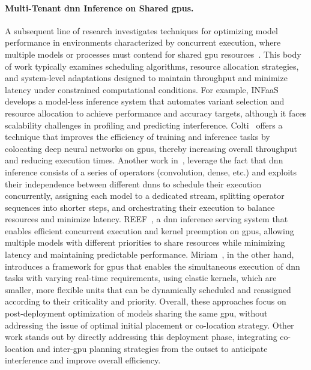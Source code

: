 \paragraph{Multi-Tenant \acrshort{dnn} Inference on Shared \acrshort{gpu}s.}
A subsequent line of research investigates techniques for optimizing model performance in environments characterized by concurrent execution, where multiple models or processes must contend for shared \acrshort{gpu} resources~\cite{mobin2023colti,yu2021automated,zhao2023miriam,francisco2021infaas}. This body of work typically examines scheduling algorithms, resource allocation strategies, and system-level adaptations designed to maintain throughput and minimize latency under constrained computational conditions. For example, INFaaS~\cite{francisco2021infaas} develops a model-less inference system that automates variant selection and resource allocation to achieve performance and accuracy targets, although it faces scalability challenges in profiling and predicting interference. Colti~\cite{mobin2023colti} offers a technique that improves the efficiency of training and inference tasks by colocating deep neural networks on \acrshort{gpu}s, thereby increasing overall throughput and reducing execution times. Another work in~\cite{yu2021automated}, leverage the fact that \acrshort{dnn} inference consists of a series of operators (convolution, dense, etc.) and exploits their independence between different \acrshort{dnn}s to schedule their execution concurrently, assigning each model to a dedicated stream, splitting operator sequences into shorter steps, and orchestrating their execution to balance resources and minimize latency. REEF~\cite{han2022microsecond}, a \acrshort{dnn} inference serving system that enables efficient concurrent execution and kernel preemption on \acrshort{gpu}s, allowing multiple models with different priorities to share resources while minimizing latency and maintaining predictable performance. Miriam~\cite{zhao2023miriam}, in the other hand, introduces a framework for \acrshort{gpu}s that enables the simultaneous execution of \acrshort{dnn} tasks with varying real-time requirements, using elastic kernels, which are smaller, more flexible units that can be dynamically scheduled and reassigned according to their criticality and priority. Overall, these approaches focus on post-deployment optimization of models sharing the same \acrshort{gpu}, without addressing the issue of optimal initial placement or co-location strategy. Other work stands out by directly addressing this deployment phase, integrating co-location and inter-\acrshort{gpu} planning strategies from the outset to anticipate interference and improve overall efficiency.

